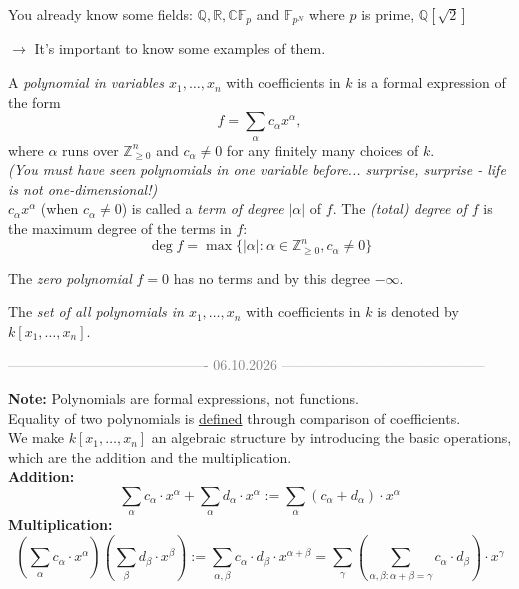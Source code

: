 You already know some fields: $\mathbb{Q}, \mathbb{R}, \mathbb{C}\mathbb{F}_p$ and $\mathbb{F}_{p^N}$ where $p$ is prime, $\mathbb{Q}[\sqrt{2}]$ 

\hspace*{0.5cm} $\rightarrow$ It's important to know some examples of them. 

\begin{definition}[title = Definition 1.1.2] 
    A \textit{polynomial in variables $x_1, \dots, x_n$} with coefficients in $k$ is a formal expression of the form 
    \begin{equation}
        f = \sum_\alpha c_\alpha x^\alpha, 
    \end{equation}
    where $\alpha$ runs over $\mathbb{Z}_{\geq 0}^n$ and $c_\alpha \neq 0$ for any finitely many choices of $k$. \\

    \hspace*{0.5cm}\textcolor{airforceblue}{\textit{(You must have seen polynomials in one variable before... surprise, surprise - life is not one-dimensional!)}}  \\

    $c_\alpha x^\alpha$ (when $c_\alpha \neq 0$) is called a \textit{term of degree} $|\alpha|$ of $f$. The \textit{(total) degree of $f$} is the maximum degree of the terms in $f$: \[\deg f = \max\{|\alpha|: \alpha \in \mathbb{Z}_{\geq 0}^n, c_\alpha \neq 0\}\]
    
    The \textit{zero polynomial} $f =0$ has no terms and by this degree $-\infty$.  
    
    The \textit{set of all polynomials in $x_1, \dots, x_n$} with coefficients in $k$ is denoted by $k[x_1, \dots, x_n]$. \\
    
\begin{center}
  \textcolor{gray}{------------------------------------------- 06.10.2026 --------------------------------------------} \\[0.3em]
\end{center} 

    \textbf{Note:} Polynomials are formal expressions, not functions. \\[0.7em]
    Equality of two polynomials is \underline{defined} through comparison of coefficients. \\[0.5em]
    We make $k[x_1, \dots, x_n]$ an algebraic structure by introducing the basic operations, which are the addition and the multiplication. \\

    \textbf{Addition:} \[\sum_\alpha c_\alpha \cdot x^\alpha + \sum_\alpha d_\alpha \cdot x^\alpha := \sum_\alpha (c_\alpha + d_\alpha) \cdot x^\alpha\] 
    \textbf{Multiplication:} \[\left(\sum_\alpha c_\alpha \cdot x^\alpha\right) \left(\sum_\beta d_\beta \cdot x^\beta\right) := \sum_{\alpha, \beta} c_\alpha \cdot d_\beta \cdot x^{\alpha + \beta} = \sum_\gamma \left(\sum_{\alpha, \beta: \alpha + \beta = \gamma} c_\alpha \cdot d_\beta \right) \cdot x^\gamma\]
  \end{definition} 
\clearpage

